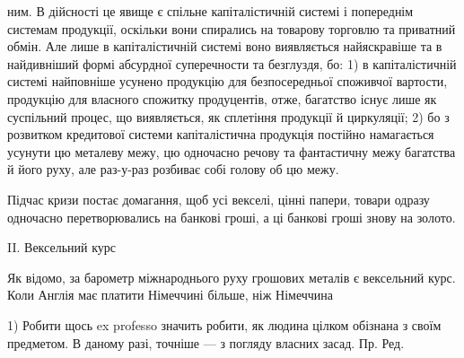 ним. В дійсності це явище є спільне капіталістичній системі і попереднім системам
продукції, оскільки вони спирались на товарову торговлю та приватний
обмін. Але лише в капіталістичній системі воно виявляється найяскравіше та
в найдивніший формі абсурдної суперечности та безглуздя, бо: 1) в капіталістичній
системі найповніше усунено продукцію для безпосередньої споживчої
вартости, продукцію для власного спожитку продуцентів, отже, багатство існує
лише як суспільний процес, що виявляється, як сплетіння продукції й циркуляції;
2) бо з розвитком кредитової системи капіталістична продукція постійно
намагається усунути цю металеву межу, цю одночасно речову та фантастичну
межу багатства й його руху, але раз-у-раз розбиває собі голову об цю межу.

Підчас кризи постає домагання, щоб усі векселі, цінні папери, товари
одразу одночасно перетворювались на банкові гроші, а ці банкові гроші знову
на золото.

II. Вексельний курс

Як відомо, за барометр міжнароднього руху грошових металів є вексельний
курс. Коли Англія має платити Німеччині більше, ніж Німеччина

1) Робити щось ex professo значить робити, як людина цілком обізнана з своїм предметом. В даному
разі, точніше — з погляду власних засад. Пр. Ред.